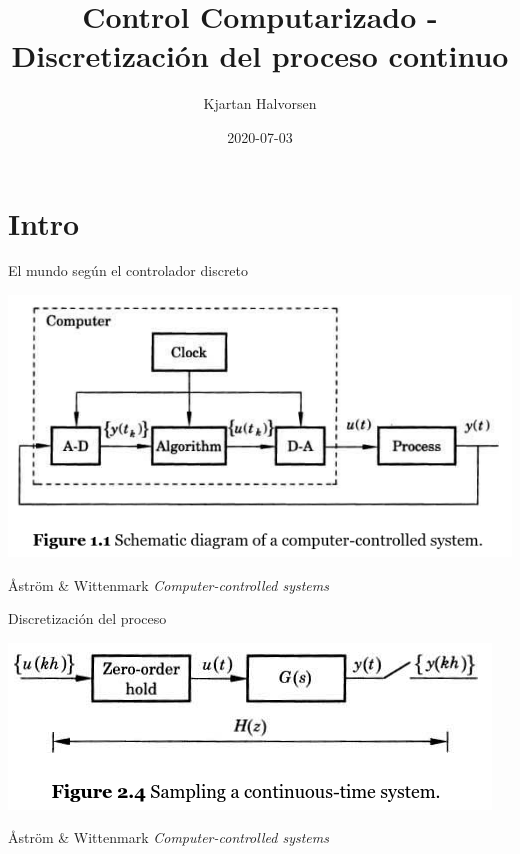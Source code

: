 \documentclass[presentation,aspectratio=169]{beamer}
\author{Kjartan Halvorsen}
\date{2020-07-03}
\title{Control Computarizado - Discretización del proceso continuo}
\begin{document}
\maketitle

\section{Intro}
\label{sec:org73ca54b}
\begin{frame}[label={sec:orgd4e92a6}]{El mundo según el controlador discreto}
\begin{center}
\includegraphics[width=0.7\linewidth]{../../figures/fig1-1-schematic.png}
\end{center}
{\footnotesize Åström \& Wittenmark \textit{Computer-controlled systems}}
\end{frame}
\begin{frame}[label={sec:orge64a893}]{Discretización del proceso}
\begin{center}
\includegraphics[width=0.6\linewidth]{../../figures/fig2-4.png}
\end{center}
{\footnotesize Åström \& Wittenmark \textit{Computer-controlled systems}}
\end{frame}
\end{document}
